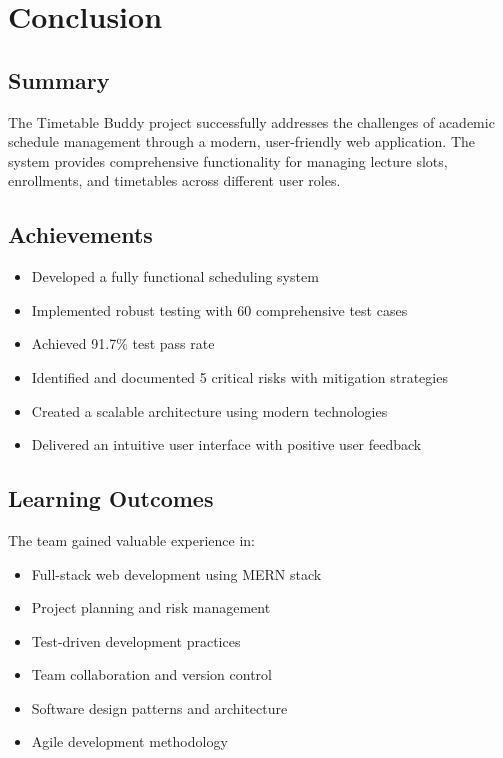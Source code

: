 \documentclass[12pt,a4paper]{report}
\begin{document}
\chapter{Conclusion}

\section{Summary}
The Timetable Buddy project successfully addresses the challenges of academic schedule management through a modern, user-friendly web application. The system provides comprehensive functionality for managing lecture slots, enrollments, and timetables across different user roles.

\section{Achievements}
\begin{itemize}[leftmargin=*]
    \item Developed a fully functional scheduling system
    \item Implemented robust testing with 60 comprehensive test cases
    \item Achieved 91.7\% test pass rate
    \item Identified and documented 5 critical risks with mitigation strategies
    \item Created a scalable architecture using modern technologies
    \item Delivered an intuitive user interface with positive user feedback
\end{itemize}

\section{Learning Outcomes}
The team gained valuable experience in:
\begin{itemize}[leftmargin=*]
    \item Full-stack web development using MERN stack
    \item Project planning and risk management
    \item Test-driven development practices
    \item Team collaboration and version control
    \item Software design patterns and architecture
    \item Agile development methodology
\end{itemize}
\end{document}
